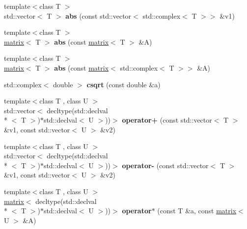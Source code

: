 \begin{DoxyCompactItemize}
\item 
\hypertarget{namespacekeycpp_acce9304ff511ac2e50ad3016045f22f6}{{\footnotesize template$<$class T $>$ }\\std\-::vector$<$ T $>$ {\bfseries abs} (const std\-::vector$<$ std\-::complex$<$ T $>$$>$ \&v1)}\label{namespacekeycpp_acce9304ff511ac2e50ad3016045f22f6}

\item 
\hypertarget{namespacekeycpp_a1f83b48bfedf753904dfea9dde554a4c}{{\footnotesize template$<$class T $>$ }\\\hyperlink{classkeycpp_1_1matrix}{matrix}$<$ T $>$ {\bfseries abs} (const \hyperlink{classkeycpp_1_1matrix}{matrix}$<$ T $>$ \&A)}\label{namespacekeycpp_a1f83b48bfedf753904dfea9dde554a4c}

\item 
\hypertarget{namespacekeycpp_ae0edec63f48a81c576da0c0ffc768af9}{{\footnotesize template$<$class T $>$ }\\\hyperlink{classkeycpp_1_1matrix}{matrix}$<$ T $>$ {\bfseries abs} (const \hyperlink{classkeycpp_1_1matrix}{matrix}$<$ std\-::complex$<$ T $>$$>$ \&A)}\label{namespacekeycpp_ae0edec63f48a81c576da0c0ffc768af9}

\item 
\hypertarget{namespacekeycpp_a952e5296774667c3be4e792b5cd980da}{std\-::complex$<$ double $>$ {\bfseries csqrt} (const double \&a)}\label{namespacekeycpp_a952e5296774667c3be4e792b5cd980da}

\item 
\hypertarget{namespacekeycpp_a4da6882977b2262f8d6f080b0eaf60c5}{{\footnotesize template$<$class T , class U $>$ }\\std\-::vector$<$ decltype(std\-::declval\\*
$<$ T $>$)$\ast$std\-::declval$<$ U $>$))$>$ {\bfseries operator+} (const std\-::vector$<$ T $>$ \&v1, const std\-::vector$<$ U $>$ \&v2)}\label{namespacekeycpp_a4da6882977b2262f8d6f080b0eaf60c5}

\item 
\hypertarget{namespacekeycpp_ab185edce957f4afd65cb641ec6307376}{{\footnotesize template$<$class T , class U $>$ }\\std\-::vector$<$ decltype(std\-::declval\\*
$<$ T $>$)$\ast$std\-::declval$<$ U $>$))$>$ {\bfseries operator-\/} (const std\-::vector$<$ T $>$ \&v1, const std\-::vector$<$ U $>$ \&v2)}\label{namespacekeycpp_ab185edce957f4afd65cb641ec6307376}

\item 
\hypertarget{namespacekeycpp_a8d5dbf37b71d16d686dd0fdbad82f8fb}{{\footnotesize template$<$class T , class U $>$ }\\\hyperlink{classkeycpp_1_1matrix}{matrix}$<$ decltype(std\-::declval\\*
$<$ T $>$)$\ast$std\-::declval$<$ U $>$))$>$ {\bfseries operator$\ast$} (const T \&a, const \hyperlink{classkeycpp_1_1matrix}{matrix}$<$ U $>$ \&A)}\label{namespacekeycpp_a8d5dbf37b71d16d686dd0fdbad82f8fb}


\end{DoxyCompactItemize}
